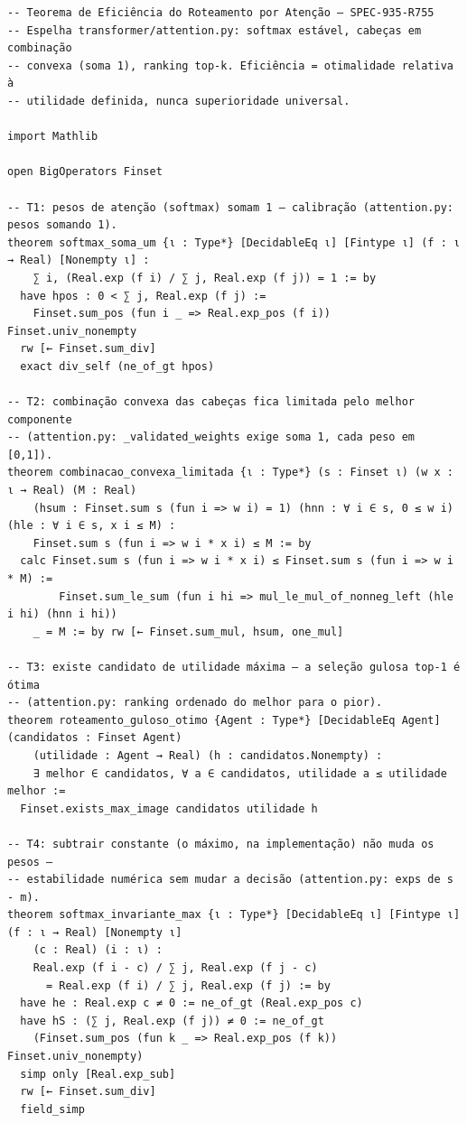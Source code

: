 \documentclass[12pt,openany,oneside,a4paper,brazil,chapter=TITLE]{abntex2}
\begin{document}
\begin{lstlisting}
-- Teorema de Eficiência do Roteamento por Atenção — SPEC-935-R755
-- Espelha transformer/attention.py: softmax estável, cabeças em combinação
-- convexa (soma 1), ranking top-k. Eficiência = otimalidade relativa à
-- utilidade definida, nunca superioridade universal.

import Mathlib

open BigOperators Finset

-- T1: pesos de atenção (softmax) somam 1 — calibração (attention.py: pesos somando 1).
theorem softmax_soma_um {ι : Type*} [DecidableEq ι] [Fintype ι] (f : ι → Real) [Nonempty ι] :
    ∑ i, (Real.exp (f i) / ∑ j, Real.exp (f j)) = 1 := by
  have hpos : 0 < ∑ j, Real.exp (f j) :=
    Finset.sum_pos (fun i _ => Real.exp_pos (f i)) Finset.univ_nonempty
  rw [← Finset.sum_div]
  exact div_self (ne_of_gt hpos)

-- T2: combinação convexa das cabeças fica limitada pelo melhor componente
-- (attention.py: _validated_weights exige soma 1, cada peso em [0,1]).
theorem combinacao_convexa_limitada {ι : Type*} (s : Finset ι) (w x : ι → Real) (M : Real)
    (hsum : Finset.sum s (fun i => w i) = 1) (hnn : ∀ i ∈ s, 0 ≤ w i) (hle : ∀ i ∈ s, x i ≤ M) :
    Finset.sum s (fun i => w i * x i) ≤ M := by
  calc Finset.sum s (fun i => w i * x i) ≤ Finset.sum s (fun i => w i * M) :=
        Finset.sum_le_sum (fun i hi => mul_le_mul_of_nonneg_left (hle i hi) (hnn i hi))
    _ = M := by rw [← Finset.sum_mul, hsum, one_mul]

-- T3: existe candidato de utilidade máxima — a seleção gulosa top-1 é ótima
-- (attention.py: ranking ordenado do melhor para o pior).
theorem roteamento_guloso_otimo {Agent : Type*} [DecidableEq Agent] (candidatos : Finset Agent)
    (utilidade : Agent → Real) (h : candidatos.Nonempty) :
    ∃ melhor ∈ candidatos, ∀ a ∈ candidatos, utilidade a ≤ utilidade melhor :=
  Finset.exists_max_image candidatos utilidade h

-- T4: subtrair constante (o máximo, na implementação) não muda os pesos —
-- estabilidade numérica sem mudar a decisão (attention.py: exps de s - m).
theorem softmax_invariante_max {ι : Type*} [DecidableEq ι] [Fintype ι] (f : ι → Real) [Nonempty ι]
    (c : Real) (i : ι) :
    Real.exp (f i - c) / ∑ j, Real.exp (f j - c)
      = Real.exp (f i) / ∑ j, Real.exp (f j) := by
  have he : Real.exp c ≠ 0 := ne_of_gt (Real.exp_pos c)
  have hS : (∑ j, Real.exp (f j)) ≠ 0 := ne_of_gt
    (Finset.sum_pos (fun k _ => Real.exp_pos (f k)) Finset.univ_nonempty)
  simp only [Real.exp_sub]
  rw [← Finset.sum_div]
  field_simp


\end{lstlisting}
\end{document}
